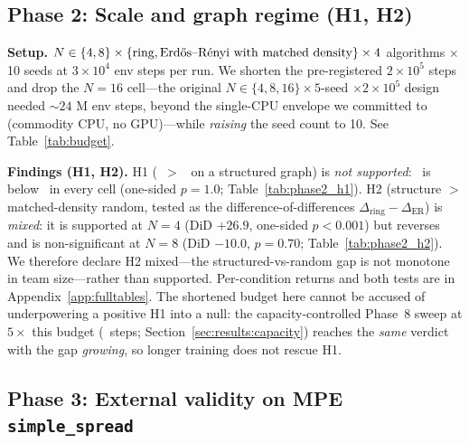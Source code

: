 

\subsection{Phase 2: Scale and graph regime (H1, H2)}
\label{sec:results:scale}

\textbf{Setup.} $N \in \{4, 8\} \times \{\text{ring}, \text{Erd\H{o}s--R\'enyi
with matched density}\} \times 4$ algorithms $\times$ 10 seeds at
$3\times 10^4$ env steps per run. We shorten the pre-registered
$2 \times 10^5$ steps and drop the $N{=}16$ cell---the original
$N \in \{4, 8, 16\} \times 5$-seed $\times 2 \times 10^5$ design needed
${\sim}24$ M env steps, beyond the single-CPU envelope we committed to
(commodity CPU, no GPU)---while \emph{raising} the seed count to 10.
See Table~\ref{tab:budget}.

\textbf{Findings (H1, H2).} H1 (\gnnqmix\ $>$ \qmix\ on a structured graph)
is \emph{not supported}: \gnnqmix\ is below \qmix\ in every cell (one-sided
$p=1.0$; Table~\ref{tab:phase2_h1}). H2 (structure $>$ matched-density random,
tested as the difference-of-differences $\Delta_{\text{ring}}-\Delta_{\text{ER}}$)
is \emph{mixed}: it is supported at $N{=}4$ (DiD $+26.9$, one-sided $p<0.001$)
but reverses and is non-significant at $N{=}8$ (DiD $-10.0$, $p=0.70$;
Table~\ref{tab:phase2_h2}). We therefore declare H2 mixed---the
structured-vs-random gap is not monotone in team size---rather than supported.
Per-condition returns and both tests are in Appendix~\ref{app:fulltables}.
The shortened budget here cannot be accused of underpowering a positive H1
into a null: the capacity-controlled Phase~8 sweep at $5\times$ this budget
(\PEsteps\ steps; Section~\ref{sec:results:capacity}) reaches the \emph{same}
verdict with the gap \emph{growing}, so longer training does not rescue H1.



\subsection{Phase 3: External validity on MPE \texttt{simple\_spread}}
\label{sec:results:mpe}

